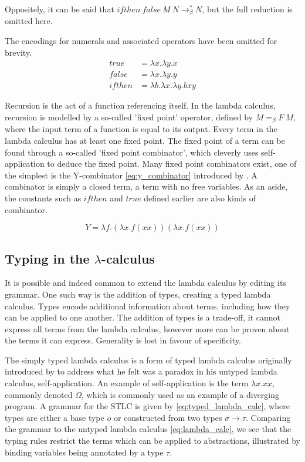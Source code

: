 \documentclass[12pt,a4paper]{report}
\theoremstyle{definition}
\theoremstyle{remark}
\begin{document}
Oppositely, it can be said that $ifthen\ false\ M\ N \rightarrow_{\beta}^* N$, but the full reduction is omitted here.

The encodings for numerals and associated operators have been omitted for brevity.
\begin{equation}\label{eq:booleans}
\begin{split}
true &= \lambda x.\lambda y.x\\
false &= \lambda x.\lambda y.y\\
ifthen &= \lambda b. \lambda x.\lambda y.bxy
\end{split}
\end{equation}

Recursion is the act of a function referencing itself. In the lambda calculus, recursion is modelled by a so-called 'fixed point' operator, defined by $M =_{\beta} F\ M$, where the input term of a function is equal to its output. Every term in the lambda calculus has at least one fixed point. The fixed point of a term can be found through a so-called 'fixed point combinator', which cleverly uses self-application to deduce the fixed point. Many fixed point combinators exist, one of the simplest is the Y-combinator \eqref{eq:y_combinator} introduced by \cite{curry_1930}. A combinator is simply a closed term, a term with no free variables. As an aside, the constants such as $ifthen$ and $true$ defined earlier are also kinds of combinator.

\begin{equation}\label{eq:y_combinator}
    Y = \lambda f.(\lambda x.f(xx))(\lambda x.f(xx))
\end{equation}

\subsection{Typing in the \texorpdfstring{$\lambda$}{lambda}-calculus}
It is possible and indeed common to extend the lambda calculus by editing its grammar. One such way is the addition of types, creating a typed lambda calculus. Types encode additional information about terms, including how they can be applied to one another. The addition of types is a trade-off, it cannot express all terms from the lambda calculus, however more can be proven about the terms it can express. Generality is lost in favour of specificity.

The simply typed lambda calculus is a form of typed lambda calculus originally introduced by \cite{church_1940} to address what he felt was a paradox in his untyped lambda calculus, self-application. An example of self-application is the term $\lambda x.xx$, commonly denoted $\Omega$, which is commonly used as an example of a diverging program. A grammar for the STLC is given by \eqref{eq:typed_lambda_calc}, where types are either a base type $o$ or constructed from two types $\sigma \rightarrow \tau$. Comparing the grammar to the untyped lambda calculus \eqref{eq:lambda_calc}, we see that the typing rules restrict the terms which can be applied to abstractions, illustrated by binding variables being annotated by a type $\tau$.
\end{document}
